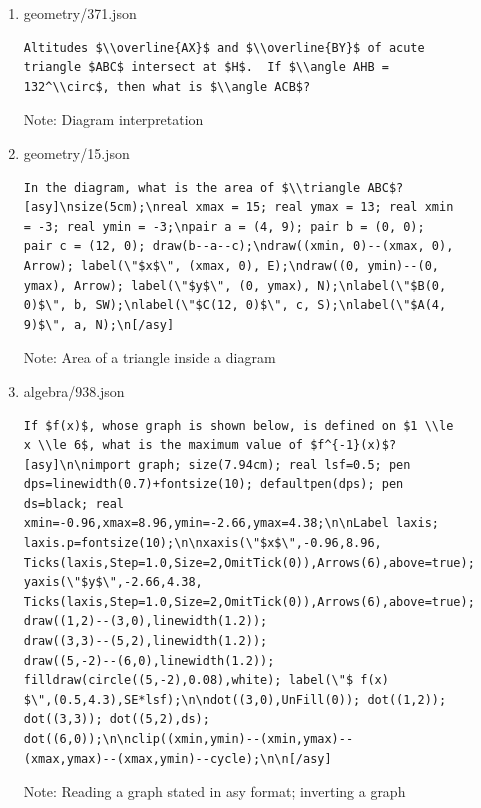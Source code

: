 \documentclass[11pt,a4paper]{article}
\begin{document}
\begin{enumerate}
  \item geometry/371.json
\begin{verbatim}
Altitudes $\\overline{AX}$ and $\\overline{BY}$ of acute
triangle $ABC$ intersect at $H$.  If $\\angle AHB =
132^\\circ$, then what is $\\angle ACB$?
\end{verbatim}
    Note: Diagram interpretation

  \item geometry/15.json
\begin{verbatim}
In the diagram, what is the area of $\\triangle ABC$?
[asy]\nsize(5cm);\nreal xmax = 15; real ymax = 13; real xmin
= -3; real ymin = -3;\npair a = (4, 9); pair b = (0, 0);
pair c = (12, 0); draw(b--a--c);\ndraw((xmin, 0)--(xmax, 0),
Arrow); label(\"$x$\", (xmax, 0), E);\ndraw((0, ymin)--(0,
ymax), Arrow); label(\"$y$\", (0, ymax), N);\nlabel(\"$B(0,
0)$\", b, SW);\nlabel(\"$C(12, 0)$\", c, S);\nlabel(\"$A(4,
9)$\", a, N);\n[/asy]
\end{verbatim}
    Note: Area of a triangle inside a diagram

  \item algebra/938.json
\begin{verbatim}
If $f(x)$, whose graph is shown below, is defined on $1 \\le
x \\le 6$, what is the maximum value of $f^{-1}(x)$?
[asy]\n\nimport graph; size(7.94cm); real lsf=0.5; pen
dps=linewidth(0.7)+fontsize(10); defaultpen(dps); pen
ds=black; real
xmin=-0.96,xmax=8.96,ymin=-2.66,ymax=4.38;\n\nLabel laxis;
laxis.p=fontsize(10);\n\nxaxis(\"$x$\",-0.96,8.96,
Ticks(laxis,Step=1.0,Size=2,OmitTick(0)),Arrows(6),above=true);
yaxis(\"$y$\",-2.66,4.38,
Ticks(laxis,Step=1.0,Size=2,OmitTick(0)),Arrows(6),above=true);
draw((1,2)--(3,0),linewidth(1.2));
draw((3,3)--(5,2),linewidth(1.2));
draw((5,-2)--(6,0),linewidth(1.2));
filldraw(circle((5,-2),0.08),white); label(\"$ f(x)
$\",(0.5,4.3),SE*lsf);\n\ndot((3,0),UnFill(0)); dot((1,2));
dot((3,3)); dot((5,2),ds);
dot((6,0));\n\nclip((xmin,ymin)--(xmin,ymax)--
(xmax,ymax)--(xmax,ymin)--cycle);\n\n[/asy]
\end{verbatim}
    Note: Reading a graph stated in asy format; inverting a graph


\end{enumerate}
\end{document}
